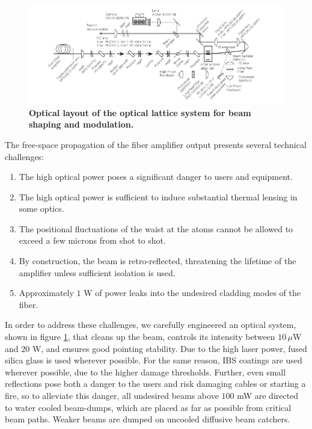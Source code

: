 \documentclass[twocolumn,aps,pra,showpacs,preprintnumbers,bibnotes]{revtex4-1}
\begin{document}
\begin{figure}
  \begin{center}
    \includegraphics{fig/optical_layout_wide.pdf}
    \caption{\textbf{Optical layout of the optical lattice system for beam shaping and modulation.}}\label{fig:optical_layout}
  \end{center}
\end{figure}

The free-space propagation of the fiber amplifier output presents several technical challenges:
\begin{enumerate}
  \item The high optical power poses a significant danger to users and equipment.
  \item The high optical power is sufficient to induce substantial thermal lensing in some optics. 
  \item The positional fluctuations of the waist at the atoms cannot be allowed to exceed a few microns from shot to shot. 
\item By construction, the beam is retro-reflected, threatening the lifetime of the amplifier unless sufficient isolation is used. 
\item Approximately $1$ W of power leaks into the undesired cladding modes of the fiber. 
  \end{enumerate}

In order to address these challenges, we carefully engineered an optical system, shown in figure \ref{fig:optical_layout}, that cleans up the beam, controls its intensity between $10\,\mu$W and $20$ W, and ensures good pointing stability.
Due to the high laser power, fused silica glass is used wherever possible.
For the same reason, IBS coatings are used wherever possible, due to the higher damage thresholds.
Further, even small reflections pose both a danger to the users and risk damaging cables or starting a fire, so to alleviate this danger, all undesired beams above $100$ mW are directed to water cooled beam-dumps, which are placed as far as possible from critical beam paths. 
Weaker beams are dumped on uncooled diffusive beam catchers.
\end{document}
